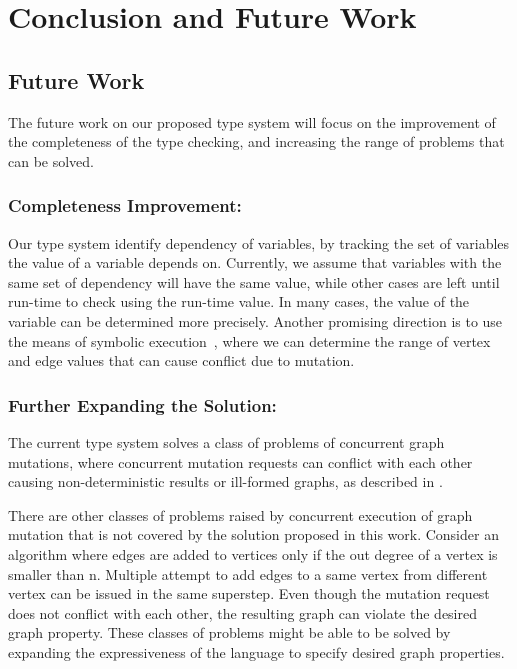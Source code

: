 \section{Conclusion and Future Work}
\label{sec:conclusion}

\subsection{Future Work}

The future work on our proposed type system will focus on the improvement of the
completeness of the type checking, and increasing the range of problems that can
be solved.

\subsubsection{Completeness Improvement:}
Our type system identify dependency of variables, by tracking the set of
variables the value of a variable depends on. Currently, we
assume that variables with the same set of dependency will have the same value,
while other cases are left until run-time to check using the run-time value. In
many cases, the value of the variable can be determined more precisely.
Another promising direction is to use the means of symbolic
execution~\cite{king1976}, where we can determine the range of vertex and edge
values that can cause conflict due to mutation.

\subsubsection{Further Expanding the Solution:}
The current type system solves a class of problems of concurrent graph mutations,
where concurrent mutation requests can conflict with each other causing
non-deterministic results or ill-formed graphs, as described in . 

There are other classes of problems raised by concurrent execution of graph
mutation that is not covered by the solution proposed in this work. Consider an
algorithm where edges are added to vertices only if the out degree of a vertex
is smaller than n. Multiple attempt to add edges to a same vertex from
different vertex can be issued in the same superstep. Even though the mutation
request does not conflict with each other, the resulting graph can violate the
desired graph property. These classes of problems might be able to be solved by
expanding the expressiveness of the language to specify desired graph
properties.

